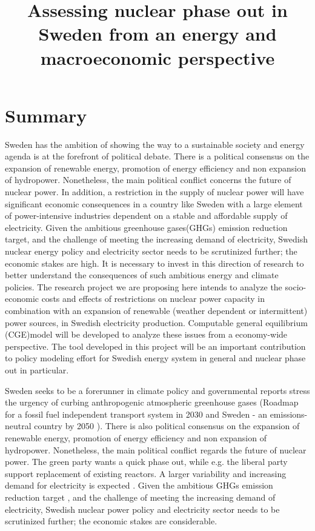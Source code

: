 


\title{Assessing nuclear phase out in Sweden from an energy and macroeconomic perspective}
\maketitle
\author{}
\date{}
\section{Summary}
Sweden has the ambition of showing the way to a sustainable society and energy agenda is at the forefront of political debate. There is a political consensus on the expansion of renewable energy, promotion of energy efficiency and non expansion of hydropower. Nonetheless, the main political conflict concerns the future of nuclear power. In addition, a restriction in the supply of nuclear power will have significant economic consequences in a country like Sweden with a large element of power-intensive industries dependent on a stable and affordable supply of electricity. Given the ambitious greenhouse gases(GHGs) emission reduction target, and the challenge of meeting the increasing demand of electricity, Swedish nuclear energy policy and electricity sector needs to be scrutinized further; the economic stakes are high. It is necessary to invest in this direction of research to better understand the consequences of such ambitious energy and climate policies. The research project we are proposing here intends to analyze the socio-economic costs and effects of restrictions on nuclear power capacity in combination with an expansion of renewable (weather dependent or intermittent) power sources, in Swedish electricity production. Computable general equilibrium (CGE)model will be developed to analyze these issues from a economy-wide perspective. The tool developed in this project will be an important contribution to policy modeling effort for Swedish energy system in general and nuclear phase out in particular.

Sweden seeks to be a forerunner in climate policy and governmental reports stress the urgency of curbing anthropogenic atmospheric greenhouse gases (Roadmap for a fossil fuel independent transport system in 2030 \cite{SOU201384} and Sweden - an emissions-neutral country by 2050 \cite{sepa2012}). There is also political consensus on the expansion of renewable energy, promotion of energy efficiency and non expansion of hydropower. Nonetheless, the main political conflict regards the future of nuclear power. The green party wants a quick phase out, while e.g. the liberal party support replacement of existing reactors. A larger variability and increasing demand for electricity is expected \cite{sepa2012, SOU201384}. Given the ambitious GHGs emission reduction target \cite{SOU201384}, and the challenge of meeting the increasing demand of electricity, Swedish nuclear power policy and electricity sector needs to be scrutinized further; the economic stakes are considerable.


